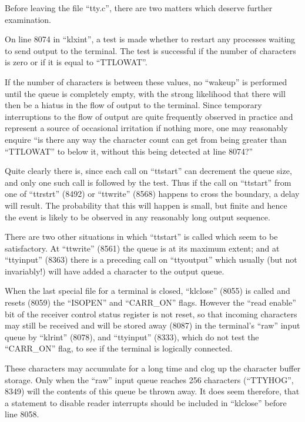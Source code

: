 Before leaving the file ``tty.c'', there
are two matters which deserve further
examination.


On line 8074 in ``klxint'', a test is
made whether to restart any processes
waiting to send output to the terminal.
The test is successful if the number of
characters is zero or if it is equal to
``TTLOWAT''.

If the number of characters is between
these values, no ``wakeup'' is performed
until the queue is completely empty,
with the strong likelihood that there
will then be a hiatus in the flow of
output to the terminal. Since temporary interruptions to the flow of
output are quite frequently observed in
practice and represent a source of
occasional irritation if nothing more,
one may reasonably enquire ``is there
any way the character count can get
from being greater than ``TTLOWAT'' to
below it, without this being detected
at line 8074?''

Quite clearly there is, since each call
on ``ttstart'' can decrement the queue
size, and only one such call is followed by the test. Thus if the call on
``ttstart'' from one of ``ttrstrt'' (8492)
or ``ttwrite'' (8568) happens to cross
the boundary, a delay will result. The
probability that this will happen is
small, but finite and hence the event
is likely to be observed in any reasonably long output sequence.

There are two other situations in which
``ttstart'' is called which seem to be
satisfactory. At ``ttwrite'' (8561) the
queue is at its maximum extent; and at
``ttyinput'' (8363) there is a preceding
call on ``ttyoutput'' which usually (but
not invariably!) will have added a
character to the output queue.


When the last special file for a terminal is closed, ``klclose'' (8055) is
called and resets (8059) the ``ISOPEN''
and ``CARR\_ON'' flags. However the ``read
enable'' bit of the receiver control
status register is not reset, so that
incoming characters may still be
received and will be stored away (8087)
in the terminal's ``raw'' input queue by
``klrint'' (8078), and ``ttyinput'' (8333),
which do not test the ``CARR\_ON'' flag,
to see if the terminal is logically
connected.

These characters may accumulate for a
long time and clog up the character
buffer storage. Only when the ``raw''
input queue reaches 256 characters
(``TTYHOG'', 8349) will the contents of
this queue be thrown away. It does seem
therefore, that a statement to disable
reader interrupts should be included in
``klclose'' before line 8058.

